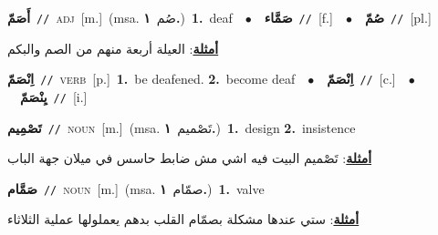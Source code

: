 \documentclass[10pt,a4paper,twoside]{article} %
\begin{document}
\begin{multicols}{2}
{\setlength\topsep{0pt}\textbf{\foreignlanguage{arabic}{أَصَمّ}}\ {\color{gray}\texttt{//}\color{black}}\ \textsc{adj}\ [m.]\ \color{gray}(msa. \foreignlanguage{arabic}{صُم}~\foreignlanguage{arabic}{\textbf{١.}})\color{black}\ \textbf{1.}~deaf\ \ $\bullet$\ \ \setlength\topsep{0pt}\textbf{\foreignlanguage{arabic}{صَمَّاء}}\ {\color{gray}\texttt{//}\color{black}}\ [f.]\ \ $\bullet$\ \ \setlength\topsep{0pt}\textbf{\foreignlanguage{arabic}{صُمّ}}\ {\color{gray}\texttt{//}\color{black}}\ [pl.]\  \begin{flushright}\color{gray}\foreignlanguage{arabic}{\textbf{\underline{\foreignlanguage{arabic}{أمثلة}}}: العيلة أربعة منهم من الصم والبكم}\end{flushright}\color{black}} \vspace{2mm}

{\setlength\topsep{0pt}\textbf{\foreignlanguage{arabic}{اِنْصَمّ}}\ {\color{gray}\texttt{//}\color{black}}\ \textsc{verb}\ [p.]\ \textbf{1.}~be deafened.  \textbf{2.}~become deaf\ \ $\bullet$\ \ \setlength\topsep{0pt}\textbf{\foreignlanguage{arabic}{اِنْصَمّ}}\ {\color{gray}\texttt{//}\color{black}}\ [c.]\ \ $\bullet$\ \ \setlength\topsep{0pt}\textbf{\foreignlanguage{arabic}{يِنْصَمّ}}\ {\color{gray}\texttt{//}\color{black}}\ [i.]\ } \vspace{2mm}

{\setlength\topsep{0pt}\textbf{\foreignlanguage{arabic}{تَصْمِيم}}\ {\color{gray}\texttt{//}\color{black}}\ \textsc{noun}\ [m.]\ \color{gray}(msa. \foreignlanguage{arabic}{تَصْميم}~\foreignlanguage{arabic}{\textbf{١.}})\color{black}\ \textbf{1.}~design  \textbf{2.}~insistence\  \begin{flushright}\color{gray}\foreignlanguage{arabic}{\textbf{\underline{\foreignlanguage{arabic}{أمثلة}}}: تَصْميم البيت فيه اشي مش ضابط حاسس في ميلان جهة الباب}\end{flushright}\color{black}} \vspace{2mm}

{\setlength\topsep{0pt}\textbf{\foreignlanguage{arabic}{صَمَّام}}\ {\color{gray}\texttt{//}\color{black}}\ \textsc{noun}\ [m.]\ \color{gray}(msa. \foreignlanguage{arabic}{صمّام}~\foreignlanguage{arabic}{\textbf{١.}})\color{black}\ \textbf{1.}~valve\  \begin{flushright}\color{gray}\foreignlanguage{arabic}{\textbf{\underline{\foreignlanguage{arabic}{أمثلة}}}: ستي عندها مشكلة بصمّام القلب بدهم يعملولها عملية الثلاثاء}\end{flushright}\color{black}} \vspace{2mm}


\end{multicols}
\end{document}
